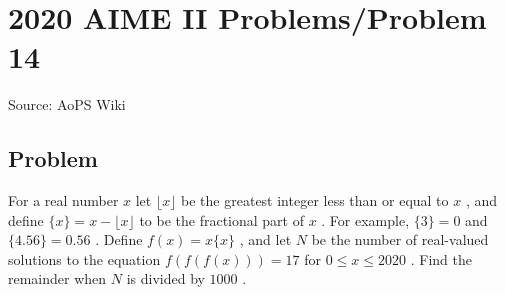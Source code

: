 \documentclass[12pt]{article}
\begin{document}
\section*{{2020 AIME II Problems/Problem 14}}
Source: AoPS Wiki

\subsection*{Problem}
For a real number $x$ let $\lfloor x\rfloor$ be the greatest integer less than or equal to $x$ , and define $\{x\} = x - \lfloor x \rfloor$ to be the fractional part of $x$ . For example, $\{3\} = 0$ and $\{4.56\} = 0.56$ . Define $f(x)=x\{x\}$ , and let $N$ be the number of real-valued solutions to the equation $f(f(f(x)))=17$ for $0\leq x\leq 2020$ . Find the remainder when $N$ is divided by $1000$ .
\end{document}
